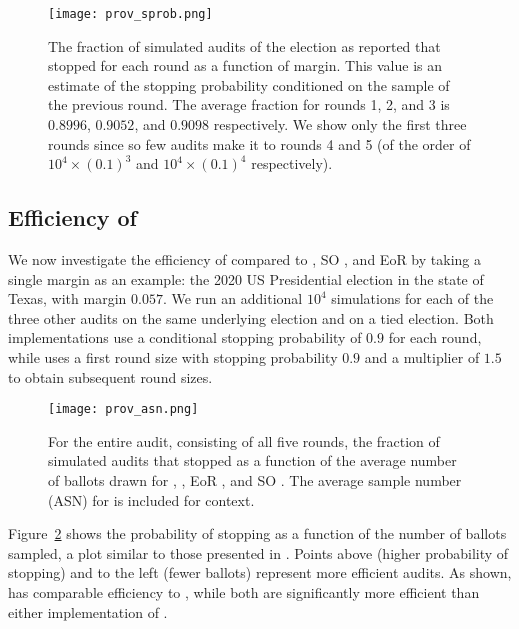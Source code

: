 \begin{figure}[h!]
\texttt{[image: prov\_sprob.png]}
\caption{The fraction of simulated \Providence audits of the election as reported that stopped for each round as a function of margin. This value is an estimate of the stopping probability conditioned on the sample of the previous round. The average fraction for rounds 1, 2, and 3 is $0.8996$, $0.9052$, and $0.9098$ respectively. We show only the first three rounds since so few audits make it to rounds 4 and 5 (of the order of $10^4 \times (0.1)^3$ and $10^4 \times (0.1)^4$ respectively).}
\label{fig:prov-sprob}
\end{figure}

\subsection{Efficiency of \Providence}
We now investigate the efficiency of \Providence compared to \Minerva, SO \BRAVO, and EoR \BRAVO by taking a single margin as an example: the 2020 US Presidential election in the state of Texas, with margin $0.057$. We run an additional $10^4$ simulations for each of the three other audits on the same underlying election and on a tied election. Both \BRAVO implementations use a conditional stopping probability of $0.9$ for each round, while \Minerva uses a first round size with stopping probability $0.9$ and a multiplier of $1.5$ to obtain subsequent round sizes. 

\begin{figure}[h!]
\texttt{[image: prov\_asn.png]}
\caption{For the entire audit, consisting of all five rounds, the fraction of simulated audits that stopped as a function of the average number of ballots drawn for \Providence, \Minerva, EoR \BRAVO, and SO \BRAVO. The average sample number (ASN) for \B \BRAVO is included for context.}
\label{fig:prov-asn}
\end{figure}
Figure~\ref{fig:prov-asn} shows the probability of stopping as a function of the number of ballots sampled, a plot similar to those presented in \cite{simulations}. Points above (higher probability of stopping) and to the left (fewer ballots) represent more efficient audits. As shown, \Providence has comparable efficiency to \Minerva, while both are significantly more efficient than either implementation of \BRAVO. 







